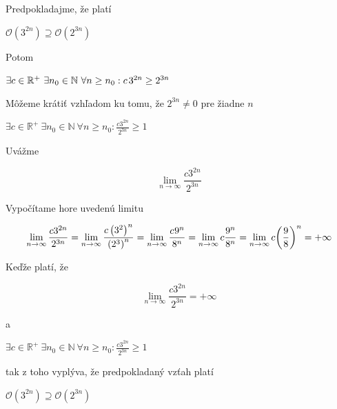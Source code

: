 \documentclass[11pt,a4paper]{article}
\begin{document}
\begin{flushright}
\begin{minipage}{0.92\textwidth}
  Predpokladajme, že platí
  \begin{center}
    $\mathcal{O}(3^{2n}) \supseteq \mathcal{O}(2^{3n})$
  \end{center}
  Potom
  \begin{center}
    $\exists c \in \mathbb{R}^{+} \ \exists n_{0} \in \mathbb{N} \ \forall n \geq n_{0}: c\hspace{0.5mm}3^{2n} \geq 2^{3n}$
  \end{center}
  Môžeme krátiť vzhľadom ku tomu, že $2^{3n} \neq 0$ pre žiadne $n$
  \begin{center}
    $\exists c \in \mathbb{R}^{+} \ \exists n_{0} \in \mathbb{N} \ \forall n \geq n_{0}: \frac{c3^{2n}}{2^{3n}} \geq 1$
  \end{center}
  Uvážme\\[-3.5em]
  \begin{center}
    $$\lim_{n\to\infty} \frac{c3^{2n}}{2^{3n}}$$
  \end{center}
\end{minipage}
\end{flushright}

\begin{flushright}
\begin{minipage}{0.92\textwidth}
  Vypočítame hore uvedenú limitu\\[-3.5em]
  \begin{center}
    $$\lim_{n\to\infty} \frac{c3^{2n}}{2^{3n}} = \lim_{n\to\infty} \frac{c\left(3^2\right)^n}{\left(2^3\right)^n} = \lim_{n\to\infty} \frac{c\hspace{0.2mm}9^n}{8^n} = \lim_{n\to\infty} c\frac{9^n}{8^n} = \lim_{n\to\infty} c{\left({\frac{9}{8}}\right)}^n = +\infty$$
  \end{center}
  Keďže platí, že\\[-3.5em]
  \begin{center}
    $$\lim_{n\to\infty} \frac{c3^{2n}}{2^{3n}} = +\infty$$
  \end{center}
  a
  \begin{center}
    $\exists c \in \mathbb{R}^{+} \ \exists n_{0} \in \mathbb{N} \ \forall n \geq n_{0}: \frac{c3^{2n}}{2^{3n}} \geq 1$
  \end{center}
  tak z toho vyplýva, že predpokladaný vzťah platí
  \begin{center}
    $\mathcal{O}(3^{2n}) \supseteq \mathcal{O}(2^{3n})$
  \end{center}
\end{minipage}
\end{flushright}
\end{document}
